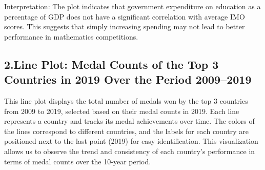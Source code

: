 \documentclass[
  letterpaper,
  DIV=11,
  numbers=noendperiod]{scrartcl}
\begin{document}
Interpretation: The plot indicates that government expenditure on
education as a percentage of GDP does not have a significant correlation
with average IMO scores. This suggests that simply increasing spending
may not lead to better performance in mathematics competitions.

\subsection{2.Line Plot: Medal Counts of the Top 3 Countries in 2019
Over the Period
2009--2019}\label{line-plot-medal-counts-of-the-top-3-countries-in-2019-over-the-period-20092019}

This line plot displays the total number of medals won by the top 3
countries from 2009 to 2019, selected based on their medal counts in
2019. Each line represents a country and tracks its medal achievements
over time. The colors of the lines correspond to different countries,
and the labels for each country are positioned next to the last point
(2019) for easy identification. This visualization allows us to observe
the trend and consistency of each country's performance in terms of
medal counts over the 10-year period.
\end{document}
